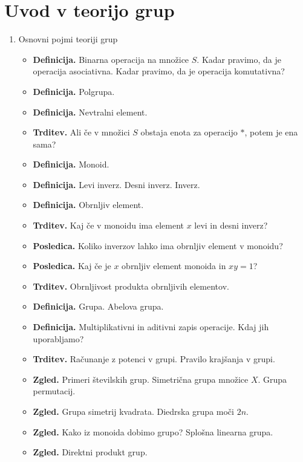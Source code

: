 \section{Uvod v teorijo grup}

\begin{enumerate}
    \item Osnovni pojmi teoriji grup
    \begin{itemize}
        \item \textbf{Definicija.} Binarna operacija na množice $S$. Kadar pravimo, da je operacija asociativna. Kadar pravimo, da je operacija komutativna?       
        \item \textbf{Definicija.} Polgrupa.
        \item \textbf{Definicija.} Nevtralni element.
        \item \textbf{Trditev.} Ali če v množici \(S\) obstaja enota za operacijo \(*\), potem je ena sama?
        \item \textbf{Definicija.} Monoid.
        \item \textbf{Definicija.} Levi inverz. Desni inverz. Inverz. 
        \item \textbf{Definicija.} Obrnljiv element.
        \item \textbf{Trditev.} Kaj če v monoidu ima element \(x\) levi in desni inverz?
        \item \textbf{Posledica.} Koliko inverzov lahko ima obrnljiv element v monoidu?
        \item \textbf{Posledica.} Kaj če je \(x\) obrnljiv element monoida in \(xy = 1\)?
        \item \textbf{Trditev.} Obrnljivost produkta obrnljivih elementov.
        \item \textbf{Definicija.} Grupa. Abelova grupa.
        \item \textbf{Definicija.} Multiplikativni in aditivni zapis operacije. Kdaj jih uporabljamo?
        \item \textbf{Trditev.} Računanje z potenci v grupi. Pravilo krajšanja v grupi.
        \item \textbf{Zgled.} Primeri številskih grup. Simetrična grupa množice \(X\). Grupa permutacij.
        \item \textbf{Zgled.} Grupa simetrij kvadrata. Diedrska grupa moči \(2n\).
        \item \textbf{Zgled.} Kako iz monoida dobimo grupo? Splošna linearna grupa.
        \item \textbf{Zgled.} Direktni produkt grup. 
    \end{itemize}   
    

\end{enumerate}
